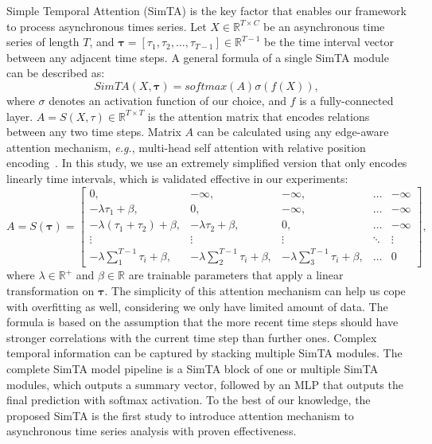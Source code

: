 \documentclass[runningheads]{llncs}
\newcommand{\eg}{\textit{e.g.}}
\begin{document}
	Simple Temporal Attention (SimTA) is the key factor that enables our framework to process asynchronous times series. Let $X \in \mathbb{R}^{T \times C}$ be an asynchronous time series of length $T$, and $\boldsymbol{\tau}=[\tau_{1},\tau_{2},\dots,\tau_{T-1}] \in \mathbb{R}^{T-1}$ be the time interval vector between any adjacent time steps. A general formula of a single SimTA module can be described as:
	\begin{equation} 
		SimTA(X,\boldsymbol{\tau})=softmax(A)\sigma(f(X)),
	\end{equation}
where $\sigma$ denotes an activation function of our choice, and $f$ is a fully-connected layer. $A=S(X,\tau) \in \mathbb{R}^{T\times T}$ is the attention matrix that encodes relations between any two time steps. Matrix $A$ can be calculated using any edge-aware attention mechanism, \eg, multi-head self attention \cite{Vaswani2017AttentionIA} with relative position encoding~\cite{Shaw2018SelfAttentionWR}. In this study, we use an extremely simplified version that only encodes linearly time intervals, which is validated effective in our experiments:
	\begin{equation}
	A=S(\boldsymbol{\tau})=
	\begin{bmatrix}
	0,       & -\infty,& -\infty, & \dots & -\infty \\
	-\lambda \tau_1+\beta,     & 0, & -\infty, & \dots & -\infty \\
	-\lambda (\tau_1+\tau_2)+\beta,     & -\lambda \tau_2+\beta,  & 0, & \dots & -\infty\\
	\vdots & \vdots & \vdots & \ddots & \vdots\\
	-\lambda \sum_{1}^{T-1}{\tau_i}+\beta,    &-\lambda \sum_{2}^{T-1}{\tau_i}+\beta,  & -\lambda \sum_{3}^{T-1}{\tau_i}+\beta,  & \dots & 0
	\end{bmatrix},
	\label{eq:simta_attn}
	\end{equation}
	where $\lambda\in \mathbb{R}^+$ and $\beta\in \mathbb{R}$ are trainable parameters that apply a linear transformation on $\boldsymbol{\tau}$. The simplicity of this attention mechanism can help us cope with overfitting as well, considering we only have limited amount of data. The formula is based on the assumption that the more recent time steps should have stronger correlations with the current time step than further ones. Complex temporal information can be captured by stacking multiple SimTA modules. The complete SimTA model pipeline is a SimTA block of one or multiple SimTA modules, which outputs a summary vector, followed by an MLP that outputs the final prediction with softmax activation. To the best of our knowledge, the proposed SimTA is the first study to introduce attention mechanism to asynchronous time series analysis with proven effectiveness.
\end{document}
